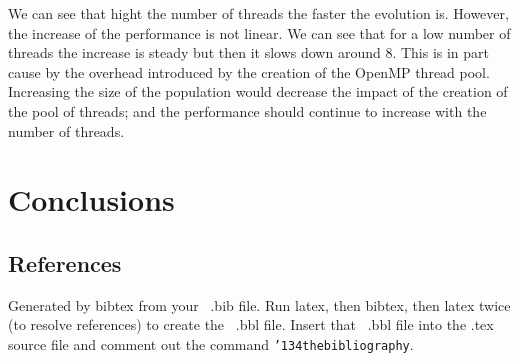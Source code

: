 \documentclass{acm_proc_article-sp}
\begin{document}
We can see that hight the number of threads the faster the evolution is. However, the increase of the performance is not linear. We can see that for a low number of threads the increase is steady but then it slows down around 8. This is in part cause by the overhead introduced by the creation of the OpenMP thread pool. Increasing the size of the population would decrease the impact of the creation of the pool of threads; and the performance should continue to increase with the number of threads.
    
\section{Conclusions}




%

%
%

\subsection{References}
Generated by bibtex from your ~.bib file.  Run latex,
then bibtex, then latex twice (to resolve references)
to create the ~.bbl file.  Insert that ~.bbl file into
the .tex source file and comment out
the command \texttt{{\char'134}thebibliography}.
\end{document}
